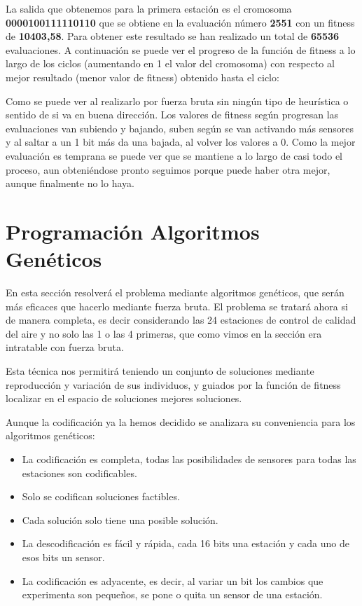 \documentclass[12pt, spanish, pdftex]{UC3M_document}
\begin{document}
La salida que obtenemos para la primera estación es el cromosoma \textbf{0000100111110110} que se obtiene en la evaluación número \textbf{2551} con un fitness de \textbf{10403,58}. Para obtener este resultado se han realizado un total de \textbf{65536} evaluaciones. A continuación se puede ver el progreso de la función de fitness a lo largo de los ciclos (aumentando en 1 el valor del cromosoma) con respecto al mejor resultado (menor valor de fitness) obtenido hasta el ciclo:
\begin{figure}[H]
	{\def\svgwidth{.95\textwidth}
		}
\end{figure}
\vspace{-.7cm}
Como se puede ver al realizarlo por fuerza bruta sin ningún tipo de heurística o sentido de si va en buena dirección. Los valores de fitness según progresan las evaluaciones van subiendo y bajando, suben según se van activando más sensores y al saltar a un 1 bit más da una bajada, al volver los valores a 0. Como la mejor evaluación es temprana se puede ver que se mantiene a lo largo de casi todo el proceso, aun obteniéndose pronto seguimos porque puede haber otra mejor, aunque finalmente no lo haya.

\section{Programación Algoritmos Genéticos}
En esta sección resolverá el problema mediante algoritmos genéticos, que serán más eficaces que hacerlo mediante fuerza bruta. El problema se tratará ahora si de manera completa, es decir considerando las 24 estaciones de control de calidad del aire y no solo las 1 o las 4 primeras, que como vimos en la sección era intratable con fuerza bruta.

Esta técnica nos permitirá teniendo un conjunto de soluciones mediante reproducción y variación de sus individuos, y guiados por la función de fitness localizar en el espacio de soluciones mejores soluciones.

Aunque la codificación ya la hemos decidido se analizara su conveniencia para los algoritmos genéticos:
\begin{itemize}
	\item La codificación es completa, todas las posibilidades de sensores para todas las estaciones son codificables.
	\item Solo se codifican soluciones factibles.
	\item Cada solución solo tiene una posible solución.
	\item La descodificación es fácil y rápida, cada 16 bits una estación y cada uno de esos bits un sensor.
	\item La codificación es adyacente, es decir, al variar un bit los cambios que experimenta son pequeños, se pone o quita un sensor de una estación.
\end{itemize}
\end{document}
